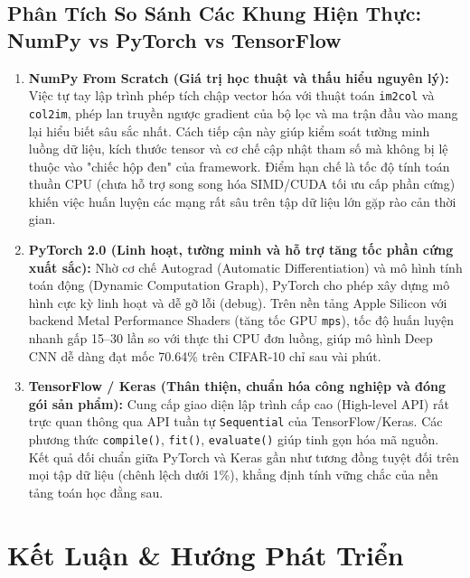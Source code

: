\documentclass[12pt,a4paper]{report}
\begin{document}
\section{Phân Tích So Sánh Các Khung Hiện Thực: NumPy vs PyTorch vs TensorFlow}
\begin{enumerate}[topsep=3pt, itemsep=4pt, parsep=2pt]
    \item \textbf{NumPy From Scratch (Giá trị học thuật và thấu hiểu nguyên lý):}
    Việc tự tay lập trình phép tích chập vector hóa với thuật toán \texttt{im2col} và \texttt{col2im}, phép lan truyền ngược gradient của bộ lọc và ma trận đầu vào mang lại hiểu biết sâu sắc nhất. Cách tiếp cận này giúp kiểm soát tường minh luồng dữ liệu, kích thước tensor và cơ chế cập nhật tham số mà không bị lệ thuộc vào "chiếc hộp đen" của framework. Điểm hạn chế là tốc độ tính toán thuần CPU (chưa hỗ trợ song song hóa SIMD/CUDA tối ưu cấp phần cứng) khiến việc huấn luyện các mạng rất sâu trên tập dữ liệu lớn gặp rào cản thời gian.
    
    \item \textbf{PyTorch 2.0 (Linh hoạt, tường minh và hỗ trợ tăng tốc phần cứng xuất sắc):}
    Nhờ cơ chế Autograd (Automatic Differentiation) và mô hình tính toán động (Dynamic Computation Graph), PyTorch cho phép xây dựng mô hình cực kỳ linh hoạt và dễ gỡ lỗi (debug). Trên nền tảng Apple Silicon với backend Metal Performance Shaders (tăng tốc GPU \texttt{mps}), tốc độ huấn luyện nhanh gấp 15--30 lần so với thực thi CPU đơn luồng, giúp mô hình Deep CNN dễ dàng đạt mốc 70.64\% trên CIFAR-10 chỉ sau vài phút.
    
    \item \textbf{TensorFlow / Keras (Thân thiện, chuẩn hóa công nghiệp và đóng gói sản phẩm):}
    Cung cấp giao diện lập trình cấp cao (High-level API) rất trực quan thông qua API tuần tự \texttt{Sequential} của TensorFlow/Keras. Các phương thức \texttt{compile()}, \texttt{fit()}, \texttt{evaluate()} giúp tinh gọn hóa mã nguồn. Kết quả đối chuẩn giữa PyTorch và Keras gần như tương đồng tuyệt đối trên mọi tập dữ liệu (chênh lệch dưới 1\%), khẳng định tính vững chắc của nền tảng toán học đằng sau.
\end{enumerate}



\chapter{Kết Luận \& Hướng Phát Triển}
\end{document}
